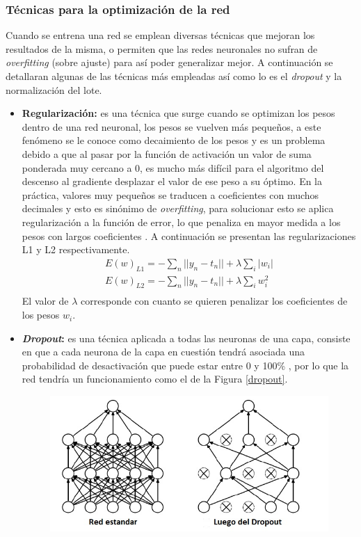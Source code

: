 \subsubsection{Técnicas para la optimización de la red}
Cuando se entrena una red se emplean diversas técnicas que mejoran los resultados de la misma, o permiten que las redes neuronales no sufran de \textit{overfitting} (sobre ajuste) para así poder generalizar mejor. A continuación se detallaran algunas de las técnicas más empleadas así como lo es el \textit{dropout} y la normalización del lote.
\begin{itemize}
    \item \textbf{Regularización:} es una técnica que surge cuando se optimizan los pesos dentro de una red neuronal, los pesos se vuelven más pequeños, a este fenómeno se le conoce como decaimiento de los pesos y es un problema debido a que al pasar por la función de activación un valor de suma ponderada muy cercano a 0, es mucho más difícil para el algoritmo del descenso al gradiente desplazar el valor de ese peso a su óptimo. En la práctica, valores muy pequeños se traducen a coeficientes con muchos decimales y esto es sinónimo de \textit{overfitting}, para solucionar esto se aplica regularización a la función de error, lo que penaliza en mayor medida a los pesos con largos coeficientes \cite[p~275]{Szeliski2022}. A continuación se presentan las regularizaciones L1 y L2 respectivamente.
    \begin{align}
          E(w)_{L1} = - \sum_{n} ||y_{n} - t_{n}|| + \lambda \sum_{i} |w_{i}|\\
          E(w)_{L2} = - \sum_{n} ||y_{n} - t_{n}|| + \lambda \sum_{i} w_{i}^{2}\\
    \end{align}
    El valor de $\lambda$ corresponde con cuanto se quieren penalizar los coeficientes de los pesos $w_{i}$.
    \item \textbf{\textit{Dropout}:} es una técnica aplicada a todas las neuronas de una capa, consiste en que a cada neurona de la capa en cuestión tendrá asociada una probabilidad de desactivación que puede estar entre 0 y 100\% \cite[p~276]{Szeliski2022}, por lo que la red tendría un funcionamiento como el de la Figura \ref{dropout}.
    \begin{figure}[H]
        \centering
        \includegraphics[scale=0.7]{Recursos/Dropout.jpg}

\end{figure}
\end{itemize}
